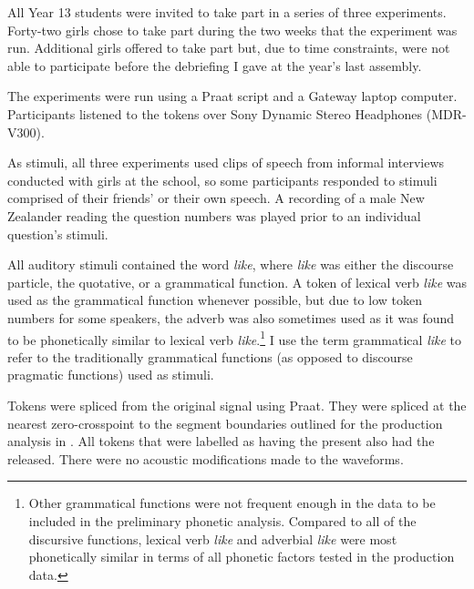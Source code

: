 All Year 13 students were invited to take part in a series of three  experiments. Forty-two girls chose to take part during the two weeks that the experiment was run. Additional girls offered to take part but, due to time constraints, were not able to participate before the debriefing I gave at the year's last assembly. 

The experiments were run using a Praat script and a Gateway laptop computer. Participants listened to the tokens over Sony Dynamic Stereo Headphones (MDR-V300).

As stimuli, all three experiments used clips of speech from informal interviews conducted with girls at the school, so some participants responded to stimuli comprised of their friends' or their own speech.  A recording of a male New Zealander reading the question numbers was played prior to an individual question's stimuli.
 
All auditory stimuli contained the word \textit{like}, where \textit{like} was either the discourse particle, the quotative, or a grammatical function. A token of lexical verb \textit{like} was used as the grammatical function whenever possible, but due to low token numbers for some speakers, the adverb was also sometimes used as it was found to be phonetically similar to lexical verb \textit{like}.\footnote{Other grammatical functions were not frequent enough in the data to be included in the preliminary phonetic analysis. Compared to all of the discursive functions, lexical verb \textit{like} and adverbial \textit{like} were most phonetically similar in terms of all phonetic factors tested in the production data.} I use the term grammatical \textit{like} to refer to the traditionally grammatical functions (as opposed to discourse pragmatic functions) used as stimuli. 

Tokens were spliced from the original signal using Praat. They were spliced at the nearest zero-crosspoint to the segment boundaries outlined for the production analysis in . All tokens that were labelled as having the  present also had the  released. There were no acoustic modifications made to the waveforms. 
 

